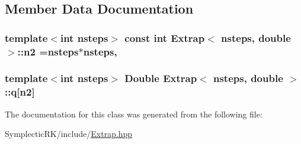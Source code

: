\subsection{Member Data Documentation}
\hypertarget{classExtrap_3_01nsteps_00_01double_01_4_a4cd49fbd82ce46befba28f302ed390d0}{
\subsubsection[{n2}]{\setlength{\rightskip}{0pt plus 5cm}template$<$int nsteps$>$ const int {\bf Extrap}$<$ nsteps, double $>$\-::n2 =nsteps$\ast$nsteps\hspace{0.3cm}{\ttfamily [static]}, {\ttfamily [private]}}}\label{classExtrap_3_01nsteps_00_01double_01_4_a4cd49fbd82ce46befba28f302ed390d0}
\hypertarget{classExtrap_3_01nsteps_00_01double_01_4_ae1e59a8f88410fcabf179d1a488e311e}{
\subsubsection[{q}]{\setlength{\rightskip}{0pt plus 5cm}template$<$int nsteps$>$ {\bf Double} {\bf Extrap}$<$ nsteps, double $>$\-::q\mbox{[}{\bf n2}\mbox{]}\hspace{0.3cm}{\ttfamily [protected]}}}\label{classExtrap_3_01nsteps_00_01double_01_4_ae1e59a8f88410fcabf179d1a488e311e}


The documentation for this class was generated from the following file\-:\begin{DoxyCompactItemize}
\item 
Symplectic\-R\-K/include/\hyperlink{Extrap_8hpp}{Extrap.\-hpp}\end{DoxyCompactItemize}
